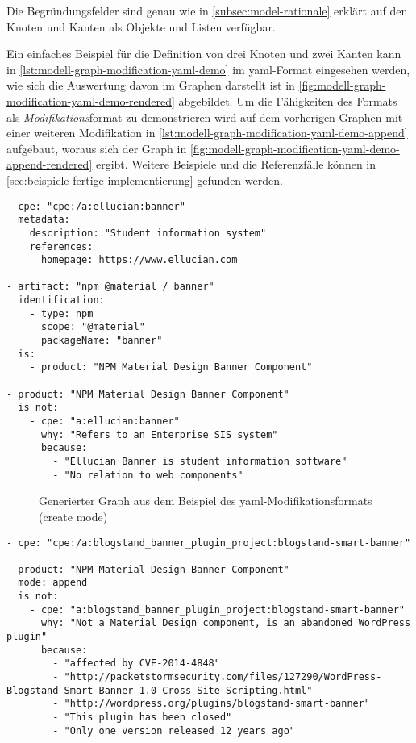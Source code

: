 Die Begründungsfelder sind genau wie in \autoref{subsec:model-rationale} erklärt auf den Knoten und Kanten als Objekte und Listen verfügbar.

Ein einfaches Beispiel für die Definition von drei Knoten und zwei Kanten kann in \autoref{lst:modell-graph-modification-yaml-demo} im \acrshort{yaml}-Format eingesehen werden, wie sich die Auswertung davon im Graphen darstellt ist in \autoref{fig:modell-graph-modification-yaml-demo-rendered} abgebildet.
Um die Fähigkeiten des Formats als \textit{Modifikations}format zu demonstrieren wird auf dem vorherigen Graphen mit einer weiteren Modifikation in \autoref{lst:modell-graph-modification-yaml-demo-append} aufgebaut, woraus sich der Graph in \autoref{fig:modell-graph-modification-yaml-demo-append-rendered} ergibt.
Weitere Beispiele und die Referenzfälle können in \autoref{sec:beispiele-fertige-implementierung} gefunden werden.

\begin{lstlisting}[style=yaml,caption={Beispiel des \acrshort{yaml}-Modifikationsformats (create mode)},label={lst:modell-graph-modification-yaml-demo},basicstyle=\ttfamily\scriptsize]
- cpe: "cpe:/a:ellucian:banner"
  metadata:
    description: "Student information system"
    references:
      homepage: https://www.ellucian.com

- artifact: "npm @material / banner"
  identification:
    - type: npm
      scope: "@material"
      packageName: "banner"
  is:
    - product: "NPM Material Design Banner Component"

- product: "NPM Material Design Banner Component"
  is not:
    - cpe: "a:ellucian:banner"
      why: "Refers to an Enterprise SIS system"
      because:
        - "Ellucian Banner is student information software"
        - "No relation to web components"
\end{lstlisting}

\begin{figure}[htbp]
    \centering
    \makebox[\textwidth]{}
    \caption{Generierter Graph aus dem Beispiel des \acrshort{yaml}-Modifikationsformats (create mode)}
    \label{fig:modell-graph-modification-yaml-demo-rendered}
\end{figure}

\begin{lstlisting}[style=yaml,caption={Beispiel des \acrshort{yaml}-Modifikationsformats (append mode)},label={lst:modell-graph-modification-yaml-demo-append},basicstyle=\ttfamily\scriptsize]
- cpe: "cpe:/a:blogstand_banner_plugin_project:blogstand-smart-banner"

- product: "NPM Material Design Banner Component"
  mode: append
  is not:
    - cpe: "a:blogstand_banner_plugin_project:blogstand-smart-banner"
      why: "Not a Material Design component, is an abandoned WordPress plugin"
      because:
        - "affected by CVE-2014-4848"
        - "http://packetstormsecurity.com/files/127290/WordPress-Blogstand-Smart-Banner-1.0-Cross-Site-Scripting.html"
        - "http://wordpress.org/plugins/blogstand-smart-banner"
        - "This plugin has been closed"
        - "Only one version released 12 years ago"
\end{lstlisting}

